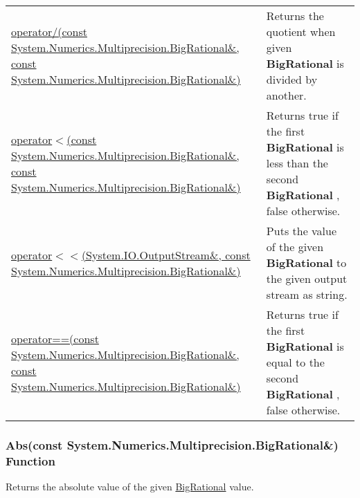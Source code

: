 \documentclass[a4paper,oneside,11.000000pt]{book}
\begin{document}
\begin{flushleft}
\begin{supertabular}[l]{!{\raggedright}p{7.575cm}!{\raggedright}p{7.575cm}}
\\
\hyperlink{System.Numerics.Multiprecision.operator.divides.C.R.System.Numerics.Multiprecision.BigRational.C.R.System.Numerics.Multiprecision.BigRational}{operator/(const System.\-Numerics.\-Multiprecision.\-BigRational\&\-, const System.\-Numerics.\-Multiprecision.\-BigRational\&\-)}
& Returns the quotient when given \textbf{BigRational}
 is divided by another.

\\
\hyperlink{System.Numerics.Multiprecision.operator.less.C.R.System.Numerics.Multiprecision.BigRational.C.R.System.Numerics.Multiprecision.BigRational}{operator$<$\-(const System.\-Numerics.\-Multiprecision.\-BigRational\&\-, const System.\-Numerics.\-Multiprecision.\-BigRational\&\-)}
& Returns true if the first \textbf{BigRational}
 is less than the second \textbf{BigRational}
, false otherwise.

\\
\hyperlink{System.Numerics.Multiprecision.operator.shiftLeft.R.System.IO.OutputStream.C.R.System.Numerics.Multiprecision.BigRational}{operator$<$\-$<$\-(System.\-IO.\-OutputStream\&\-, const System.\-Numerics.\-Multiprecision.\-BigRational\&\-)}
& Puts the value of the given \textbf{BigRational}
 to the given output stream as string.

\\
\hyperlink{System.Numerics.Multiprecision.operator.equal.C.R.System.Numerics.Multiprecision.BigRational.C.R.System.Numerics.Multiprecision.BigRational}{operator==(const System.\-Numerics.\-Multiprecision.\-BigRational\&\-, const System.\-Numerics.\-Multiprecision.\-BigRational\&\-)}
& Returns true if the first \textbf{BigRational}
 is equal to the second \textbf{BigRational}
, false otherwise.

\\
\end{supertabular}

\end{flushleft}
\clearpage

\hypertarget{System.Numerics.Multiprecision.Abs.C.R.System.Numerics.Multiprecision.BigRational}{\subsubsection*{Abs(const System.Numerics.Multiprecision.BigRational\&) Function}}
\begin{flushleft}
Returns the absolute value of the given \hyperlink{System.Numerics.Multiprecision.BigRational}{BigRational} value.

\end{flushleft}
\end{document}
